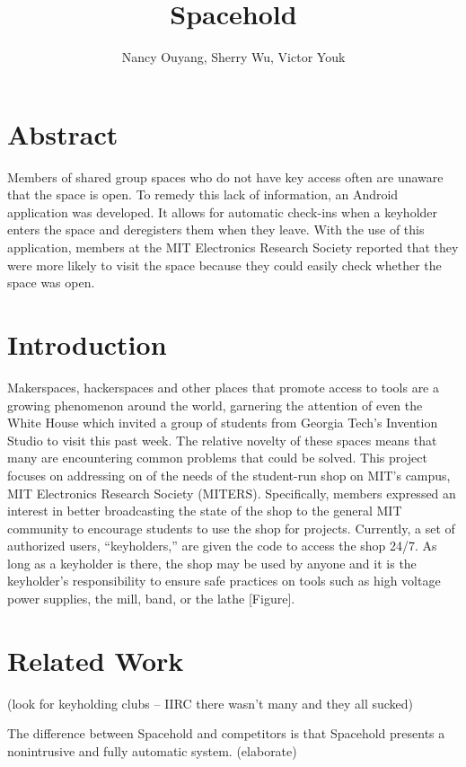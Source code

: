 \documentclass[11pt,twocolumn]{article}
\title{Spacehold}
\author{Nancy Ouyang, Sherry Wu, Victor Youk}
\begin{document}
\maketitle

\section{Abstract}
Members of shared group spaces who do not have key access often are unaware that the space is open. To remedy this lack of information, an Android application was developed. It allows for automatic check-ins when a keyholder enters the space and deregisters them when they leave. With the use of this application, members at the MIT Electronics Research Society reported that they were more likely to visit the space because they could easily check whether the space was open.

\section{Introduction}
Makerspaces, hackerspaces and other places that promote access to tools are a growing phenomenon around the world, garnering the attention of even the White House which invited a group of students from Georgia Tech's Invention Studio to visit this past week. The relative novelty of these spaces means that many are encountering common problems that could be solved. This project focuses on addressing on of the needs of the student-run shop on MIT's campus, MIT Electronics Research Society (MITERS). Specifically, members expressed an interest in better broadcasting the state of the shop to the general MIT community to encourage students to use the shop for projects. Currently, a set of authorized users, ``keyholders,'' are given the code to access the shop 24/7. As long as a keyholder is there, the shop may be used by anyone and it is the keyholder's responsibility to ensure safe practices on tools such as high voltage power supplies, the mill, band, or the lathe [Figure].

\section{Related Work}
(look for keyholding clubs -- IIRC there wasn't many and they all sucked)

The difference between Spacehold and competitors is that Spacehold presents a nonintrusive and fully automatic system. (elaborate)
\end{document}
